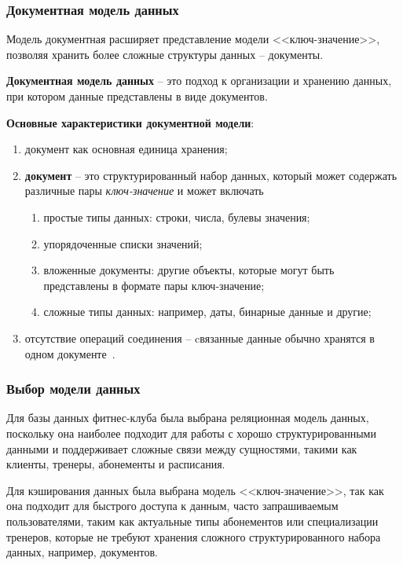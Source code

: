  
\subsubsection{Документная модель данных}

Модель документная расширяет представление модели <<ключ-значение>>, позволяя хранить более сложные структуры данных -- документы.

\textbf{Документная модель данных} -- это подход к организации и хранению данных, при котором данные представлены в виде документов.

\textbf{Основные характеристики документной модели}:
 \begin{enumerate}[label=\arabic*)]
	\item документ как основная единица хранения;
	\item \textbf{документ} -- это структурированный набор данных, который может содержать различные пары \textit{ключ-значение} и может включать
	\begin{enumerate}[label=---]
		\item простые типы данных: строки, числа, булевы значения;
		\item упорядоченные списки значений;
		\item вложенные документы: другие объекты, которые могут быть представлены в формате пары ключ-значение;
		\item сложные типы данных: например, даты, бинарные данные и другие;
	\end{enumerate}
	\item отсутствие операций соединения -- cвязанные данные обычно хранятся в одном документе~\cite[С. 92-96]{Avrunyev2018}.
\end{enumerate}

\subsubsection*{Выбор модели данных}

Для базы данных фитнес-клуба была выбрана реляционная модель данных, поскольку она наиболее подходит для работы с хорошо структурированными данными и поддерживает сложные связи между сущностями, такими как клиенты, тренеры, абонементы и расписания. 

Для кэширования данных была выбрана модель <<ключ-значение>>, так как она подходит для быстрого доступа к данным, часто запрашиваемым пользователями, таким как актуальные типы абонементов или специализации тренеров, которые не требуют хранения сложного структурированного набора данных, например, документов. 

